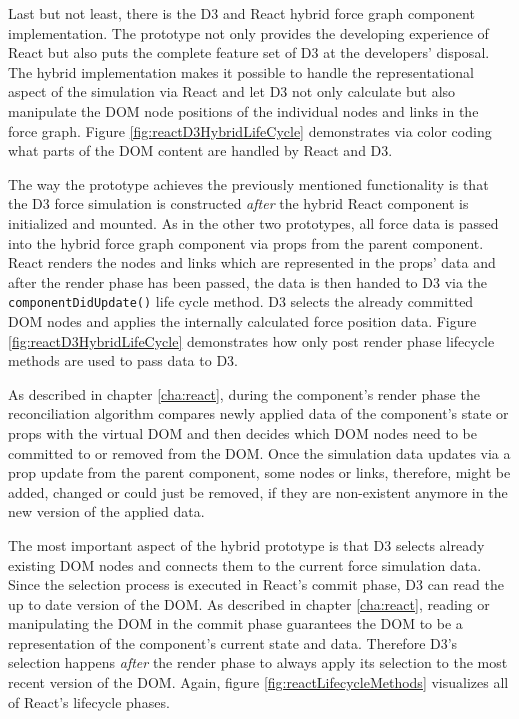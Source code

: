 Last but not least, there is the D3 and React hybrid force graph component implementation. The prototype not only provides the developing experience of React but also puts the complete feature set of D3 at the developers' disposal. The hybrid implementation makes it possible to handle the representational aspect of the simulation via React and let D3 not only calculate but also manipulate the DOM node positions of the individual nodes and links in the force graph. Figure \ref{fig:reactD3HybridLifeCycle} demonstrates via color coding what parts of the DOM content are handled by React and D3. 

The way the prototype achieves the previously mentioned functionality is that the D3 force simulation is constructed \emph{after} the hybrid React component is initialized and mounted. As in the other two prototypes, all force data is passed into the hybrid force graph component via props from the parent component. React renders the nodes and links which are represented in the props' data and after the render phase has been passed, the data is then handed to D3 via the \texttt{componentDidUpdate()} life cycle method. D3 selects the already committed DOM nodes and applies the internally calculated force position data. Figure \ref{fig:reactD3HybridLifeCycle} demonstrates how only post render phase lifecycle methods are used to pass data to D3.

As described in chapter \ref{cha:react}, during the component's render phase the reconciliation algorithm compares newly applied data of the component's state or props with the virtual DOM and then decides which DOM nodes need to be committed to or removed from the DOM. Once the simulation data updates via a prop update from the parent component, some nodes or links, therefore, might be added, changed or could just be removed, if they are non-existent anymore in the new version of the applied data.

The most important aspect of the hybrid prototype is that D3 selects already existing DOM nodes and connects them to the current force simulation data. Since the selection process is executed in React's commit phase, D3 can read the up to date version of the DOM. As described in chapter \ref{cha:react}, reading or manipulating the DOM in the commit phase guarantees the DOM to be a representation of the component's current state and data. Therefore D3's selection happens \emph{after} the render phase to always apply its selection to the most recent version of the DOM. Again, figure \ref{fig:reactLifecycleMethods} visualizes all of React's lifecycle phases.

